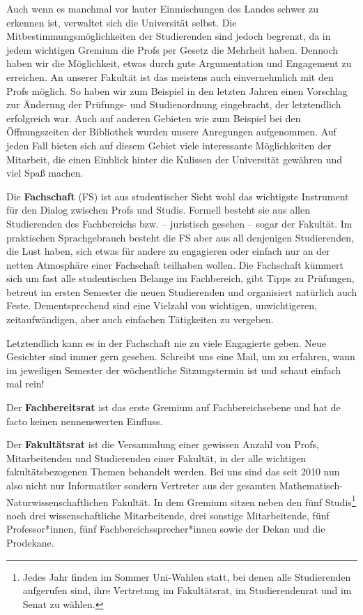 %

Auch wenn es manchmal vor lauter Einmischungen des Landes schwer zu erkennen
  ist, verwaltet sich die Universität selbst.  Die Mitbestimmungsmöglichkeiten
  der Studierenden sind jedoch begrenzt, da in jedem wichtigen Gremium die
  Profs per Gesetz die Mehrheit haben.  Dennoch haben wir die Möglichkeit,
  etwas durch gute Argumentation und Engagement zu erreichen. An unserer
  Fakultät ist das meistens auch einvernehmlich mit den Profs möglich.  So
  haben wir zum Beispiel in den letzten Jahren einen Vorschlag zur Änderung der
  Prüfungs- und Studienordnung eingebracht, der letztendlich erfolgreich war.
  Auch auf anderen Gebieten wie zum Beispiel bei den Öffnungszeiten der
  Bibliothek wurden unsere Anregungen aufgenommen. Auf jeden Fall bieten sich
  auf diesem Gebiet viele interessante Möglichkeiten der Mitarbeit, die
  einen Einblick hinter die Kulissen der Universität gewähren und viel Spaß
  machen.

Die \textbf{Fachschaft} (FS) ist aus studentischer Sicht wohl das wichtigste
  Instrument für den Dialog zwischen Profs und Studis.  Formell besteht sie
  aus allen Studierenden des Fachbereichs bzw. -- juristisch gesehen -- sogar der
  Fakultät. Im praktischen Sprachgebrauch besteht die FS aber aus all denjenigen
  Studierenden, die Lust haben, sich etwas für andere zu engagieren
  oder einfach nur an der netten Atmosphäre einer Fachschaft teilhaben wollen.
  Die Fachschaft kümmert sich um fast alle studentischen Belange im Fachbereich,
  gibt Tipps zu Prüfungen, betreut im ersten Semester die neuen Studierenden und
  organisiert natürlich auch Feste.
  Dementsprechend sind eine Vielzahl von wichtigen, unwichtigeren,
  zeitaufwändigen, aber auch einfachen Tätigkeiten zu vergeben.

Letztendlich kann  es in der Fachschaft nie zu viele Engagierte geben. Neue
Gesichter sind immer gern gesehen. Schreibt uns eine Mail, um zu erfahren, wann
im jeweiligen Semester der w\"ochentliche Sitzungstermin ist und schaut einfach
mal rein!

Der \textbf{Fachbereitsrat} ist das erste Gremium auf Fachbereichsebene und hat
de facto keinen nennenswerten Einfluss.

Der \textbf{Fakultätsrat} ist die Versammlung einer gewissen Anzahl von
  Profs, Mitarbeitenden und Studierenden einer Fakultät, in der alle wichtigen
  fakultätsbezogenen Themen behandelt werden.  Bei uns sind das seit 2010
  nun also nicht nur Informatiker sondern Vertreter aus der gesamten
  Mathematisch- Naturwissenschaftlichen Fakultät.  In dem Gremium sitzen
  neben den fünf Studis\footnote{Jedes Jahr finden im Sommer Uni-Wahlen
  statt, bei denen alle Studierenden aufgerufen sind, ihre Vertretung im
  Fakultätsrat, im Studierendenrat und im Senat zu wählen.} noch drei wissenschaftliche
  Mitarbeitende, drei sonstige Mitarbeitende, fünf Professor*innen, fünf
  Fachbereichssprecher*innen sowie der Dekan und die Prodekane.


